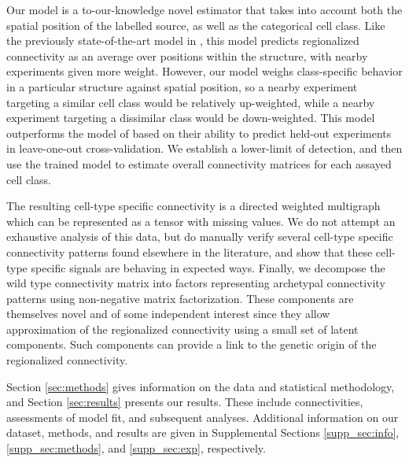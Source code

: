 Our model is a to-our-knowledge novel estimator that takes into account both the spatial position of the labelled source, as well as the categorical cell class.
Like the previously state-of-the-art model in \citet{Knox2019-ot}, this model predicts regionalized connectivity as an average over positions within the structure, with nearby experiments given more weight.
However, our model weighs class-specific behavior in a particular structure against spatial position, so a nearby experiment targeting a similar cell class would be relatively up-weighted, while a nearby experiment targeting a dissimilar class would be down-weighted.
This model outperforms the model of  \citet{Knox2019-ot} based on their ability to predict held-out experiments in leave-one-out cross-validation.
We establish a lower-limit of detection, and then use the trained model to estimate overall connectivity matrices for each assayed cell class.

The resulting cell-type specific connectivity is a directed weighted multigraph which can be represented as a tensor with missing values.
We do not attempt an exhaustive analysis of this data, but do manually verify several cell-type specific connectivity patterns found elsewhere in the literature, and show that these cell-type specific signals are behaving in expected ways.
Finally, we decompose the wild type connectivity matrix into factors representing archetypal connectivity patterns using non-negative matrix factorization.
These components are themselves novel and of some independent interest since they allow approximation of the regionalized connectivity using a small set of latent components.
Such components can provide a link to the genetic origin of the regionalized connectivity.

Section \ref{sec:methods} gives information on the data and statistical methodology, and Section \ref{sec:results} presents our results.
These include connectivities, assessments of model fit, and subsequent analyses.
Additional information on our dataset, methods, and results are given in Supplemental Sections \ref{supp_sec:info}, \ref{supp_sec:methods}, and \ref{supp_sec:exp}, respectively.